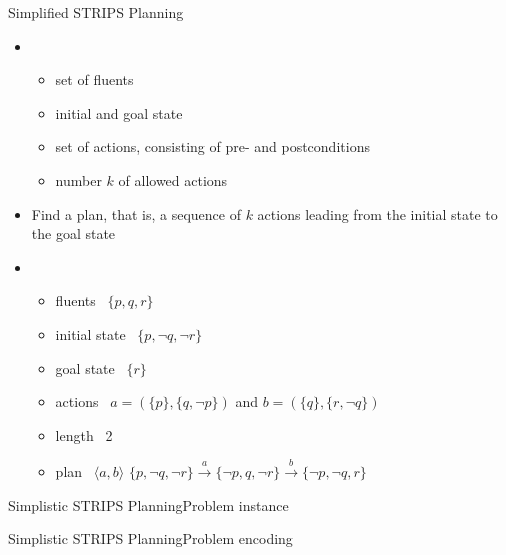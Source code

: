 \begin{frame}{Simplified STRIPS Planning}

  \begin{itemize}
  \item<2-> 
    \begin{itemize}
    \item set of fluents
    \item initial and goal state
    \item set of actions, consisting of pre- and postconditions
    \item number $k$ of allowed actions
    \end{itemize}
  \item<2-> 
    Find a plan, that is, a sequence of $k$ actions leading from the initial state to the goal state
    \smallskip
  \item<3-> 
    \begin{itemize}
    \item fluents       \ $\{p,     q,     r\}$
    \item initial state \ $\{p,\neg q,\neg r\}$
    \item goal state    \ $\{r\}$
    \item actions       \ $a = (\{p\},\{q,\neg p\})$ and $b = (\{q\},\{r,\neg q\})$
    \item length        \ 2
      \medskip
    \item<4-> plan      \ $\langle a, b \rangle$
      \qquad
      \(
      \{     p,\neg q,\neg r\}
      \stackrel{a}{\longrightarrow}
      \{\neg p,     q,\neg r\}
      \stackrel{b}{\longrightarrow}
      \{\neg p,\neg q,     r\}
      \)
    \end{itemize}
    \medskip
  \end{itemize}

\end{frame}
\begin{frame}{Simplistic STRIPS Planning}{Problem instance}
  
\end{frame}
\begin{frame}{Simplistic STRIPS Planning}{Problem encoding}
  
\end{frame}
